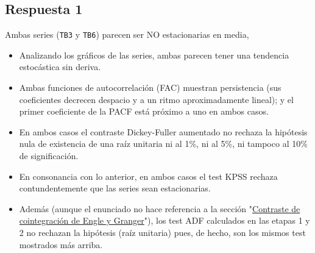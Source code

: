 \documentclass[10pt]{article}
\begin{document}
\subsection*{Respuesta 1}
\label{sec:orgc24f3d4}

Ambas series (\texttt{TB3} y \texttt{TB6}) parecen ser NO
estacionarias en media,
\begin{itemize}
\item Analizando los gráficos de las series, ambas parecen tener una
tendencia estocástica sin deriva.

\item Ambas funciones de autocorrelación (FAC) muestran persistencia (sus
coeficientes decrecen despacio y a un ritmo aproximadamente lineal);
y el primer coeficiente de la PACF está próximo a uno en ambos
casos.

\item En ambos casos el contraste Dickey-Fuller aumentado no rechaza la
hipótesis nula de existencia de una raíz unitaria ni al 1\%, ni al
5\%, ni tampoco al 10\% de significación.

\item En consonancia con lo anterior, en ambos casos el test KPSS rechaza
contundentemente que las series sean estacionarias.

\item Además (aunque el enunciado no hace referencia a la sección
"\hyperref[sec:org17e476f]{Contraste de cointegración de Engle y Granger}"), los test ADF
calculados en las etapas 1 y 2 no rechazan la hipótesis (raíz
unitaria) pues, de hecho, son los mismos test mostrados más arriba.
\end{itemize}
\end{document}
